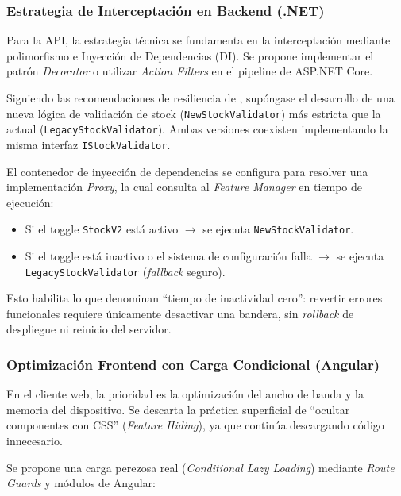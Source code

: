 \subsubsection{Estrategia de Interceptación en Backend (.NET)}

Para la API, la estrategia técnica se fundamenta en la interceptación mediante polimorfismo e Inyección de Dependencias (DI). Se propone implementar el patrón \textit{Decorator} o utilizar \textit{Action Filters} en el pipeline de ASP.NET Core.

Siguiendo las recomendaciones de resiliencia de \cite{esther2025microservices}, supóngase el desarrollo de una nueva lógica de validación de stock (\texttt{NewStockValidator}) más estricta que la actual (\texttt{LegacyStockValidator}). Ambas versiones coexisten implementando la misma interfaz \texttt{IStockValidator}.

El contenedor de inyección de dependencias se configura para resolver una implementación \textit{Proxy}, la cual consulta al \textit{Feature Manager} en tiempo de ejecución:

\begin{itemize}
    \item Si el toggle \texttt{StockV2} está activo $\rightarrow$ se ejecuta \texttt{NewStockValidator}.
    \item Si el toggle está inactivo o el sistema de configuración falla $\rightarrow$ se ejecuta \texttt{LegacyStockValidator} (\textit{fallback} seguro).
\end{itemize}

Esto habilita lo que \cite{ramaswamy2024zerodowntime} denominan ``tiempo de inactividad cero'': revertir errores funcionales requiere únicamente desactivar una bandera, sin \textit{rollback} de despliegue ni reinicio del servidor.



\subsubsection{Optimización Frontend con Carga Condicional (Angular)}

En el cliente web, la prioridad es la optimización del ancho de banda y la memoria del dispositivo. Se descarta la práctica superficial de ``ocultar componentes con CSS'' (\textit{Feature Hiding}), ya que continúa descargando código innecesario.

Se propone una carga perezosa real (\textit{Conditional Lazy Loading}) mediante \textit{Route Guards} y módulos de Angular:

